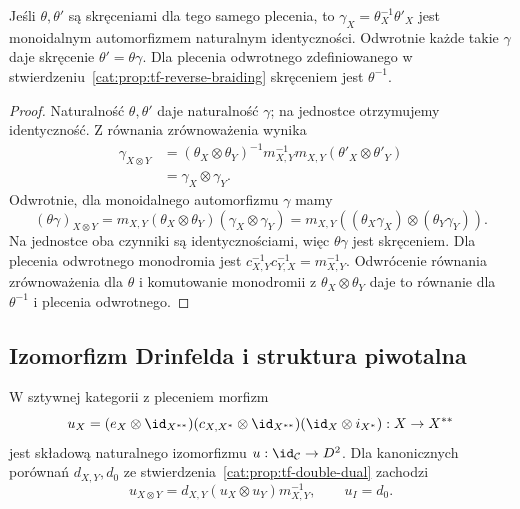 \begin{stwierdzenie}\label{cat:prop:tf-twist-ratio}
Jeśli $\theta,\theta'$ są skręceniami dla tego samego plecenia, to $\gamma_X=\theta_X^{-1}\theta'_X$ jest monoidalnym automorfizmem naturalnym identyczności. Odwrotnie każde takie $\gamma$ daje skręcenie $\theta'=\theta\gamma$. Dla plecenia odwrotnego zdefiniowanego w stwierdzeniu~\ref{cat:prop:tf-reverse-braiding} skręceniem jest $\theta^{-1}$.
\end{stwierdzenie}
\begin{proof}
Naturalność $\theta,\theta'$ daje naturalność $\gamma$; na jednostce otrzymujemy identyczność. Z równania zrównoważenia wynika
\[
\begin{aligned}
 \gamma_{X\otimes Y}
 &=(\theta_X\otimes\theta_Y)^{-1}
 m_{X,Y}^{-1}m_{X,Y}(\theta'_X\otimes\theta'_Y)\\
 &=\gamma_X\otimes\gamma_Y.
\end{aligned}
\]
Odwrotnie, dla monoidalnego automorfizmu $\gamma$ mamy
\[
 (\theta\gamma)_{X\otimes Y}
 =m_{X,Y}(\theta_X\otimes\theta_Y)(\gamma_X\otimes\gamma_Y)
 =m_{X,Y}((\theta_X\gamma_X)\otimes(\theta_Y\gamma_Y)).
\]
Na jednostce oba czynniki są identycznościami, więc $\theta\gamma$ jest skręceniem. Dla plecenia odwrotnego monodromia jest
$c_{X,Y}^{-1}c_{Y,X}^{-1}=m_{X,Y}^{-1}$. Odwrócenie równania zrównoważenia dla $\theta$ i komutowanie monodromii z $\theta_X\otimes\theta_Y$ daje to równanie dla $\theta^{-1}$ i plecenia odwrotnego.
\end{proof}

\subsection{Izomorfizm Drinfelda i struktura piwotalna}

\begin{twierdzenie}\label{cat:thm:tf-drinfeld-iso}
W sztywnej kategorii z pleceniem morfizm
\begin{equation}\label{cat:eq:tf-drinfeld-iso}
 u_X=(e_X\otimes\id_{X^{**}})
 (c_{X,X^*}\otimes\id_{X^{**}})
 (\id_X\otimes i_{X^*}):X\to X^{**}
\end{equation}
jest składową naturalnego izomorfizmu $u:\id_{\mathcal C}\to D^2$. Dla kanonicznych porównań $d_{X,Y},d_0$ ze stwierdzenia~\ref{cat:prop:tf-double-dual} zachodzi
\begin{equation}\label{cat:eq:tf-drinfeld-monoidal}
 u_{X\otimes Y}=d_{X,Y}(u_X\otimes u_Y)m_{X,Y}^{-1},
 \qquad u_I=d_0.
\end{equation}
\end{twierdzenie}

